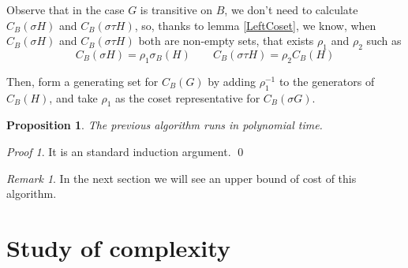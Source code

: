 \documentclass[12pt,a4paper]{book}
\theoremstyle{plain}
\newtheorem{proposition}{Proposition}
\theoremstyle{definition}
\theoremstyle{remark}
\newtheorem{remark}{Remark}
\newtheorem*{Proof}{Proof}
\begin{document}
\begin{algorithm} \label{CB(G)}\hypertarget{CB(G)}{}
 
\caption{$C_B (\sigma G ) $}
\end{algorithm}

Observe that in the case  $G$ is transitive on $B$, we don't need to calculate $C_{B}( \sigma H)$ and $C_B ( \sigma \tau H )$, so,
 thanks to lemma \ref{LeftCoset}, we know, when $C_B( \sigma H)$ and $C_B( \sigma \tau H)$ both are non-empty sets, that  exists $\rho_1$ and 
$\rho_2 $ such as
\[
 C_B( \sigma H) = \rho_1 \sigma_B(H) \qquad C_B ( \sigma \tau H)= \rho_2 C_B( H)
\]

Then, form a generating set for $C_B(G)$ by adding $\rho_1^{-1}$ to the generators of $C_B(H)$, and take $\rho_1$ as the coset representative 
for $C_B( \sigma G)$.

\begin{proposition}
 The previous algorithm runs in polynomial time.
\end{proposition}

\begin{Proof}
 It is an standard induction argument.
 \qed  \end{Proof}

\begin{remark}
 In the next section we will see an upper bound of cost of this algorithm.
\end{remark}

\section{Study of complexity}
\end{document}
